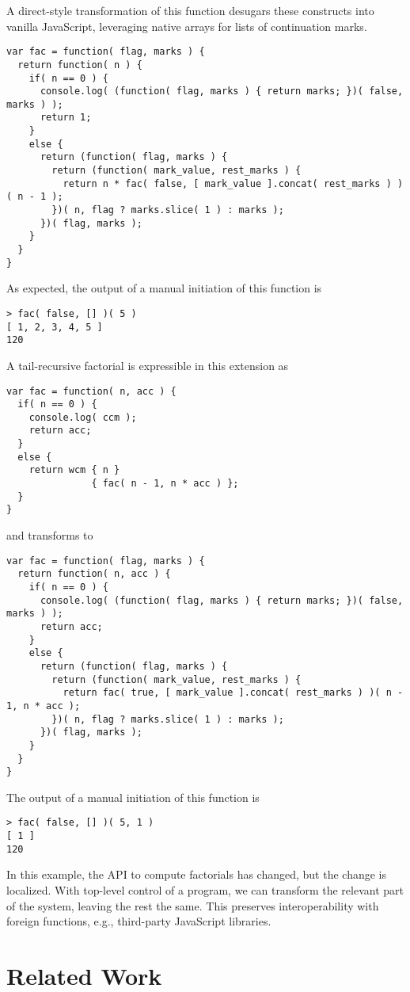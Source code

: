 \documentclass{llncs}
\begin{document}
A direct-style transformation of this function desugars these constructs into vanilla JavaScript, leveraging native arrays for lists of continuation marks.
\begin{verbatim}
var fac = function( flag, marks ) {
  return function( n ) {
    if( n == 0 ) {
      console.log( (function( flag, marks ) { return marks; })( false, marks ) );
      return 1;
    }
    else {
      return (function( flag, marks ) {
        return (function( mark_value, rest_marks ) {
          return n * fac( false, [ mark_value ].concat( rest_marks ) )( n - 1 );
        })( n, flag ? marks.slice( 1 ) : marks );
      })( flag, marks );
    }
  }
}
\end{verbatim}

As expected, the output of a manual initiation of this function is
\begin{verbatim}
> fac( false, [] )( 5 )
[ 1, 2, 3, 4, 5 ]
120
\end{verbatim}

A tail-recursive factorial is expressible in this extension as
\begin{verbatim}
var fac = function( n, acc ) {
  if( n == 0 ) {
    console.log( ccm );
    return acc;
  }
  else {
    return wcm { n }
               { fac( n - 1, n * acc ) };
  }
}
\end{verbatim}
and transforms to
\begin{verbatim}
var fac = function( flag, marks ) {
  return function( n, acc ) {
    if( n == 0 ) {
      console.log( (function( flag, marks ) { return marks; })( false, marks ) );
      return acc;
    }
    else {
      return (function( flag, marks ) {
        return (function( mark_value, rest_marks ) {
          return fac( true, [ mark_value ].concat( rest_marks ) )( n - 1, n * acc );
        })( n, flag ? marks.slice( 1 ) : marks );
      })( flag, marks );
    }
  }
}
\end{verbatim}

The output of a manual initiation of this function is
\begin{verbatim}
> fac( false, [] )( 5, 1 )
[ 1 ]
120
\end{verbatim}

In this example, the API to compute factorials has changed, but the change is localized. With top-level control of a program, we can transform the relevant part of the system, leaving the rest the same. This preserves interoperability with foreign functions, e.g., third-party JavaScript libraries.
 
\section{Related Work}
\end{document}
